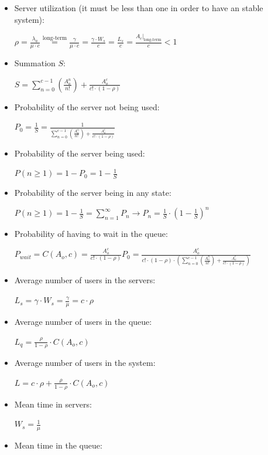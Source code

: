 \documentclass[
	12pt,
	twoside
]{book}
\begin{document}
\begin{itemize}
	\item {
		Server utilization (it must be less than one in order to have an stable system):

		$
			\rho =
			\frac {\lambda_a} {\mu \cdot c} \overset {\textrm{long-term}} {=}
			\frac {\gamma} {\mu \cdot c} =
			\frac {\gamma \cdot W_s} {c} =
			\frac {L_s} {c} =
			\frac {\left. A_c \right|_{\textrm{long-term}}} {c}
			< 1
		$
	}
	\item {
		Summation $S$:

		$
			S =
			\sum_{n=0}^{c-1} \left( \frac {A_{o}^n} {n!} \right) + \frac {A_{o}^c} {c! \cdot (1-\rho)}
		$
	}
	\item {
		Probability of the server not being used:

		$
			P_0 = \frac {1} {S} = \frac {1} {\sum_{n=0}^{c-1} \left( \frac {A_{o}^n} {n!} \right) + \frac {A_{o}^c} {c! \cdot (1-\rho)}}
		$
	}
	\item {
		Probability of the server being used:

		$
			P(n \geq 1) = 1 - P_0 = 1 - \frac {1} {S}
		$
	}
	\item {
		Probability of the server being in any state:

		$
			P(n \geq 1) = 1 - \frac {1} {S} = \sum_{n=1}^{\infty} P_n \rightarrow
			P_n = \frac {1} {S} \cdot \left( 1 - \frac {1} {S} \right)^n
		$
	}
	\item {
		Probability of having to wait in the queue:

		$
			P_{wait} = C(A_o, c) = \frac {A_{o}^c} {c! \cdot (1-\rho)} P_0 =  \frac {A_{o}^c} { c! \cdot (1-\rho) \cdot \left( \sum_{n=0}^{c-1} \left( \frac {A_{o}^n} {n!} \right) + \frac {A_{o}^c} {c! \cdot (1-\rho)} \right) }
		$
	}
	\item {
		Average number of users in the servers:

		$
			L_s = \gamma \cdot W_s = \frac {\gamma} {\mu} = c \cdot \rho
		$
	}
	\item {
		Average number of users in the queue:

		$
			L_q = \frac {\rho} {1-\rho} \cdot C(A_o, c)
		$
	}
	\item {
		Average number of users in the system:

		$
			L = c \cdot \rho + \frac {\rho} {1-\rho} \cdot C(A_o, c)
		$
	}
	\item {
		Mean time in servers:

		$
			W_s = \frac {1} {\mu}
		$
	}
	\item {
		Mean time in the queue:

}
\end{itemize}
\end{document}
